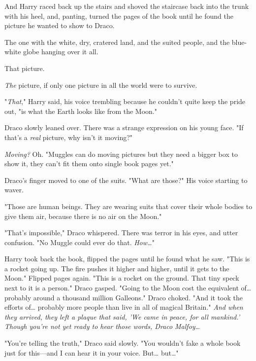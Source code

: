 And Harry raced back up the stairs and shoved the staircase back into the trunk 
with his heel, and, panting, turned the pages of the book until he found the 
picture he wanted to show to Draco.

The one with the white, dry, cratered land, and the suited people, and the 
blue-white globe hanging over it all.

That picture.

\emph{The} picture, if only one picture in all the world were to survive.

"\emph{That}," Harry said, his voice trembling because he couldn't quite keep 
the pride out, "is what the Earth looks like from the Moon."

Draco slowly leaned over. There was a strange expression on his young face. "If 
that's a \emph{real} picture, why isn't it moving?"

\emph{Moving?} Oh. "Muggles can do moving pictures but they need a bigger box 
to show it, they can't fit them onto single book pages yet."

Draco's finger moved to one of the suits. "What are those?" His voice starting 
to waver.

"Those are human beings. They are wearing suits that cover their whole bodies 
to give them air, because there is no air on the Moon."

"That's impossible," Draco whispered. There was terror in his eyes, and utter 
confusion. "No Muggle could ever do that. \emph{How{\ldots}}"

Harry took back the book, flipped the pages until he found what he saw. "This 
is a rocket going up. The fire pushes it higher and higher, until it gets to 
the Moon." Flipped pages again. "This is a rocket on the ground. That tiny 
speck next to it is a person." Draco gasped. "Going to the Moon cost the 
equivalent of{\ldots} probably around a thousand million Galleons." Draco 
choked. "And it took the efforts of{\ldots} probably more people than live in 
all of magical Britain." \emph{And when they arrived, they left a plaque that 
said, 'We came in peace, for all mankind.' Though you're not yet ready to hear 
those words, Draco Malfoy{\ldots}}

"You're telling the truth," Draco said slowly. "You wouldn't fake a whole book 
just for this---and I can hear it in your voice. But{\ldots} but{\ldots}"

